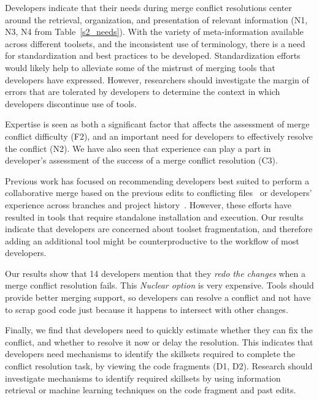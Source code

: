 Developers indicate that their needs during merge conflict resolutions center around the retrieval, organization, and presentation of relevant information (N1, N3, N4 from Table~\ref{s2_needs}).
With the variety of meta-information available across different toolsets, and the inconsistent use of terminology, there is a need for standardization and best practices to be developed.
Standardization efforts would likely help to alleviate some of the mistrust of merging tools that developers have expressed.
However, researchers should investigate the margin of errors that are tolerated by developers to determine the context in which developers discontinue use of tools.

Expertise is seen as both a significant factor that affects the assessment of merge conflict difficulty (F2), and an important need for developers to effectively resolve the conflict (N2).
We have also seen that experience can play a part in developer's assessment of the success of a merge conflict resolution (C3).

Previous work has focused on recommending developers best suited to perform a collaborative merge based on the previous edits to conflicting files~\cite{dasilva2015niche} or developers' experience across branches and project history~\cite{CostaSarma}. 
However, these efforts have resulted in tools that require standalone installation and execution. 
Our results indicate that developers are concerned about toolset fragmentation, and therefore adding an additional tool might be counterproductive to the workflow of most developers. 

Our results show that 14 developers mention that they \emph{redo the changes} when a merge conflict resolution fails.
This \emph{Nuclear option} is very expensive.
Tools should provide better merging support, so developers can resolve a conflict and not have to scrap good code just because it happens to intersect with other changes.

Finally, we find that developers need to quickly estimate whether they can fix the conflict, and whether to resolve it now or delay the resolution. 
This indicates that developers need mechanisms to identify the skillsets required to complete the conflict resolution task, by viewing the code fragments (D1, D2).
Research should investigate mechanisms to identify required skillsets by using information retrieval or machine learning techniques on the code fragment and past edits.
